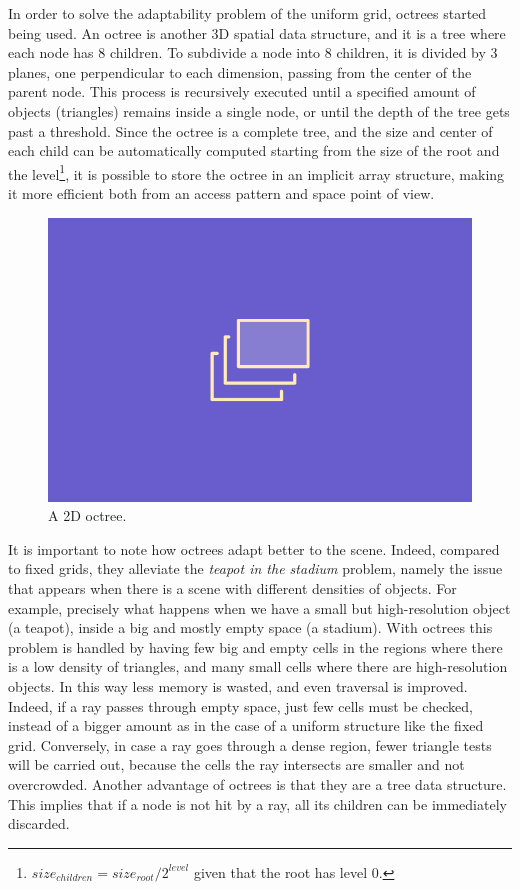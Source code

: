 \documentclass{PoliMi_MasterThesis}
\begin{document}
In order to solve the adaptability problem of the uniform grid, octrees started being used. An octree is another 3D spatial data structure, and it is a tree where each node has 8 children. To subdivide a node into 8 children, it is divided by 3 planes, one perpendicular to each dimension, passing from the center of the parent node. This process is recursively executed until a specified amount of objects (triangles) remains inside a single node, or until the depth of the tree gets past a threshold. Since the octree is a complete tree, and the size and center of each child can be automatically computed starting from the size of the root and the level\footnote{$size_{children} = size_{root} / 2^{level}$ given that the root has level $0$.}, it is possible to store the octree in an implicit array structure, making it more efficient both from an access pattern and space point of view.

\begin{figure}[H]
    \centering
    \includegraphics[width=\textwidth*\real{0.6}]{Images/TODO.png}
    \caption{A 2D octree.}
    \label{fig:octree}
\end{figure}

It is important to note how octrees adapt better to the scene. Indeed, compared to fixed grids, they alleviate the \textit{teapot in the stadium} problem, namely the issue that appears when there is a scene with different densities of objects. For example, precisely what happens when we have a small but high-resolution object (a teapot), inside a big and mostly empty space (a stadium). With octrees this problem is handled by having few big and empty cells in the regions where there is a low density of triangles, and many small cells where there are high-resolution objects. In this way less memory is wasted, and even traversal is improved. Indeed, if a ray passes through empty space, just few cells must be checked, instead of a bigger amount as in the case of a uniform structure like the fixed grid. Conversely, in case a ray goes through a dense region, fewer triangle tests will be carried out, because the cells the ray intersects are smaller and not overcrowded. Another advantage of octrees is that they are a tree data structure. This implies that if a node is not hit by a ray, all its children can be immediately discarded.
\end{document}
